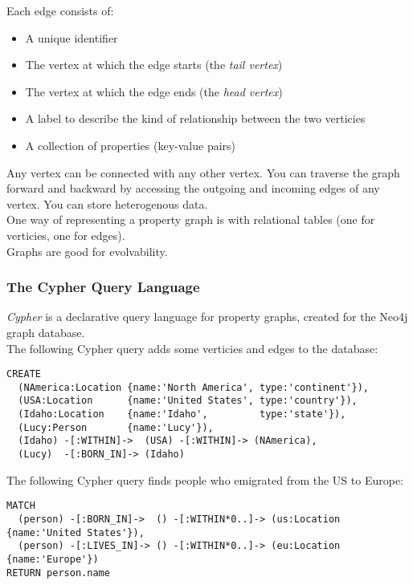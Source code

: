 \documentclass[12pt, titlepage]{article}
\begin{document}
Each edge consists of:

\begin{itemize}
    \item A unique identifier
    \item The vertex at which the edge starts (the \textit{tail vertex})
    \item The vertex at which the edge ends (the \textit{head vertex})
    \item A label to describe the kind of relationship between the two verticies
    \item A collection of properties (key-value pairs)
\end{itemize}

Any vertex can be connected with any other vertex. You can traverse the graph forward and backward by accessing the outgoing and incoming edges of any vertex. You can store heterogenous data. \\

One way of representing a property graph is with relational tables (one for verticies, one for edges). \\

Graphs are good for evolvability.

\subsubsection{The Cypher Query Language}

\textit{Cypher} is a declarative query language for property graphs, created for the Neo4j graph database. \\

The following Cypher query adds some verticies and edges to the database:

\begin{verbatim}
CREATE
  (NAmerica:Location {name:'North America', type:'continent'}),
  (USA:Location      {name:'United States', type:'country'}),
  (Idaho:Location    {name:'Idaho',         type:'state'}),
  (Lucy:Person       {name:'Lucy'}),
  (Idaho) -[:WITHIN]->  (USA) -[:WITHIN]-> (NAmerica),
  (Lucy)  -[:BORN_IN]-> (Idaho)
\end{verbatim}

The following Cypher query finds people who emigrated from the US to Europe:

\begin{verbatim}
MATCH
  (person) -[:BORN_IN]->  () -[:WITHIN*0..]-> (us:Location {name:'United States'}),
  (person) -[:LIVES_IN]-> () -[:WITHIN*0..]-> (eu:Location {name:'Europe'})
RETURN person.name
\end{verbatim}
\end{document}
